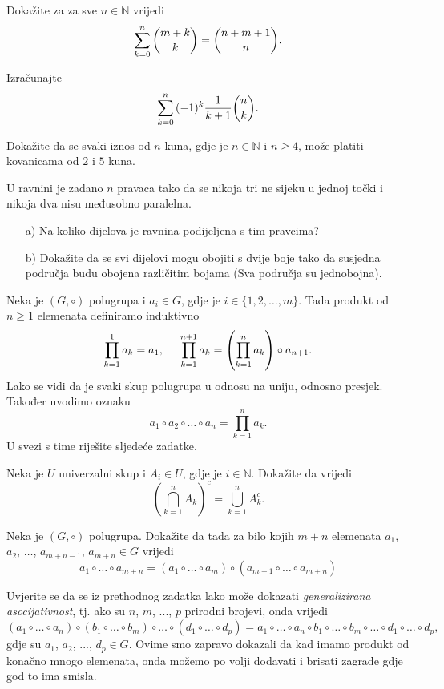 \begin{exercise}
Dokažite za za sve $n\in \mathbb{N}$ vrijedi
$$\sum_{k=0}^n{\dbinom{m+k}{k}}=\dbinom{n+m+1}{n}.$$
\end{exercise}
\begin{exercise}
Izračunajte
$$\sum_{k=0}^n{(-1)^k\dfrac{1}{k+1}\dbinom{n}{k}}.$$
\end{exercise}
\begin{exercise}
Dokažite da se svaki iznos od $n$ kuna, gdje je $n\in \mathbb{N}$ i $n\geq 4$, može platiti kovanicama od $2$ i $5$ kuna.
\end{exercise}
\begin{exercise} U ravnini je zadano $n$ pravaca tako da se nikoja tri ne sijeku u jednoj točki i nikoja dva nisu međusobno paralelna.
\begin{itemize}
\item[a)] Na koliko dijelova je ravnina podijeljena s tim pravcima?
\item[b)] Dokažite da se svi dijelovi mogu obojiti s dvije boje tako da susjedna područja budu obojena različitim bojama (Sva područja su jednobojna).
\end{itemize}
\end{exercise}
\begin{remark}
Neka je $(G, \circ)$ polugrupa i $a_i\in G$, gdje je $i\in \{1, 2, \dots, m\}$. Tada produkt od $n\geq 1$ elemenata definiramo induktivno
\begin{gather*}
\prod_{k=1}^{1}{a_k}=a_1,\hspace{0.5cm}
\prod_{k=1}^{n+1}{a_k}=\left(\prod_{k=1}^{n}{a_k}\right)\circ a_{n+1}.
\end{gather*}
Lako se vidi da je svaki skup polugrupa u odnosu na uniju, odnosno presjek. Također uvodimo oznaku
$$a_1\circ a_2\circ \dots\circ a_n=\prod_{k=1}^{n}{a_k}.$$
U svezi s time riješite sljedeće zadatke.
\end{remark}

\begin{exercise}
Neka je $U$ univerzalni skup i $A_i\in U$, gdje je $i\in \mathbb{N}$. Dokažite da vrijedi
$$\left(\bigcap_{k=1}^n{A_k}\right)^c=\bigcup_{k=1}^n{A_k^c}.$$
\end{exercise}
\begin{exercise}
\label{genasoc}
Neka je $(G,\circ)$ polugrupa. Dokažite da tada za bilo kojih $m+n$ elemenata $a_1$, $a_2$, $\dots$, $a_{m+n-1}$, $a_{m+n}\in G$ vrijedi
$$a_1\circ\dots\circ a_{m+n}=(a_1\circ\dots\circ a_m)\circ(a_{m+1}\circ\dots\circ a_{m+n})$$
\end{exercise}
Uvjerite se da se iz prethodnog zadatka lako može dokazati \textit{generalizirana asocijativnost}, tj. ako su $n$, $m$, $...$, $p$ prirodni brojevi, onda vrijedi
$$(a_1\circ\dots \circ a_n)\circ (b_1\circ \dots \circ b_m)\circ\dots\circ (d_1\circ\dots\circ d_p)=a_1\circ\dots\circ a_n\circ b_1\circ\dots\circ b_m\circ\dots\circ d_1\circ\dots\circ d_p,$$
gdje su $a_1$, $a_2$, $...$, $d_p\in G$. Ovime smo zapravo dokazali da kad imamo produkt od konačno mnogo elemenata, onda možemo po volji dodavati i brisati zagrade gdje god to ima smisla.

